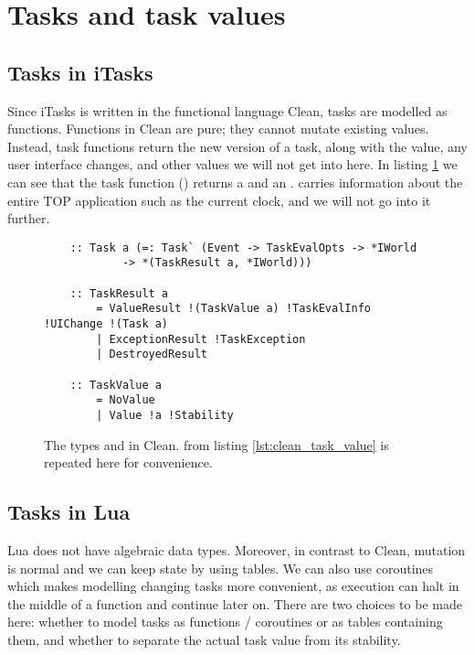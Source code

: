 \section{Tasks and task values}\label{section-task-values}

\subsection{Tasks in iTasks}
Since iTasks is written in the functional language Clean, tasks are modelled as functions. Functions in Clean are pure; they cannot mutate existing values. Instead, task functions return the new version of a task, along with the value, any user interface changes, and other values we will not get into here. In listing \ref{lst:clean_task_taskresult_types} we can see that the task function () returns a  and an .  carries information about the entire TOP application such as the current clock, and we will not go into it further.

\begin{figure}[ht]
    \centering
    \begin{verbatim}
    :: Task a (=: Task` (Event -> TaskEvalOpts -> *IWorld
            -> *(TaskResult a, *IWorld)))
    
    :: TaskResult a
        = ValueResult !(TaskValue a) !TaskEvalInfo !UIChange !(Task a)
        | ExceptionResult !TaskException
        | DestroyedResult
    
    :: TaskValue a
        = NoValue
        | Value !a !Stability
    \end{verbatim}
    \caption{The types  and  in Clean.  from listing \ref{lst:clean_task_value} is repeated here for convenience.}
    \label{lst:clean_task_taskresult_types}
\end{figure}

\subsection{Tasks in Lua}
Lua does not have algebraic data types. Moreover, in contrast to Clean, mutation is normal and we can keep state by using tables. We can also use coroutines which makes modelling changing tasks more convenient, as execution can halt in the middle of a function and continue later on. There are two choices to be made here: whether to model tasks as functions / coroutines or as tables containing them, and whether to separate the actual task value from its stability.

